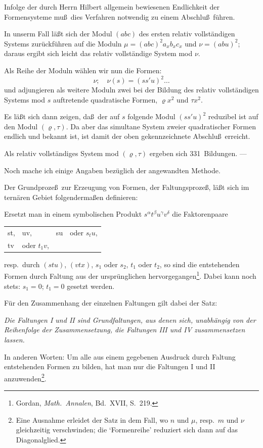 \documentclass[11pt,a4paper]{article}
\theoremstyle{plain}
\theoremstyle{definition}
\begin{document}
Infolge der durch Herrn Hilbert allgemein bewiesenen Endlichkeit der Formensysteme mu\ss\ dies Verfahren notwendig zu einem Abschlu\ss\ f\"uhren.

In unserm Fall l\"a\ss t sich der Modul $(abc)$ des ersten relativ vollst\"andigen Systems zur\"uckf\"uhren auf die Moduln $\mu = (abc)^2 a_x b_x c_x$ und $\nu = (abu)^2$; daraus ergibt sich leicht das relativ vollst\"andige System mod $\nu$.

Als Reihe der Moduln w\"ahlen wir nun die Formen:
\[
\nu; \quad \nu(s) = (ss'u)^2 \dots
\]
und adjungieren als weitere Moduln zwei bei der Bildung des relativ vollst\"andigen Systems mod $s$ auftretende quadratische Formen, $\varrho x^2$ und $\tau x^2$.

Es l\"a\ss t sich dann zeigen, da\ss\ der auf $s$ folgende Modul $(ss'u)^2$ reduzibel ist auf den Modul $(\varrho, \tau)$. Da aber das simultane System zweier quadratischer Formen endlich und bekannt ist, ist damit der oben gekennzeichnete Abschlu\ss\ erreicht.

Als relativ vollst\"andiges System mod $(\varrho, \tau)$ ergeben sich 331~Bildungen. ---

Noch mache ich einige Angaben bez\"uglich der angewandten Methode.

Der Grundproze\ss\ zur Erzeugung von Formen, der Faltungsproze\ss, l\"a\ss t sich im tern\"aren Gebiet folgenderma\ss en definieren:

Ersetzt man in einem symbolischen Produkt $s^\alpha t^\beta u^\gamma v^\delta$ die Faktorenpaare
\begin{center}
\begin{tabular}{llll}
st, & uv, & su & oder \quad $s_tu$, \\
tv & oder \quad $t_1v$, &
\end{tabular}
\end{center}
resp.~durch $(stu)$, $(vtx)$, $s_1$ oder $s_2$, $t_1$ oder $t_2$,
so sind die entstehenden Formen durch Faltung aus der urspr\"unglichen hervorgegangen\footnote{Gordan, \textit{Math.~Annalen}, Bd.~XVII, S.~219.}. Dabei kann noch stets: $s_1 = 0$; $t_1 = 0$ gesetzt werden.

F\"ur den Zusammenhang der einzelnen Faltungen gilt dabei der Satz:

\textit{Die Faltungen I und II sind Grundfaltungen, aus denen sich, unabh\"angig von der Reihenfolge der Zusammensetzung, die Faltungen III und IV zusammensetzen lassen.}

In anderen Worten: Um alle aus einem gegebenen Ausdruck durch Faltung entstehenden Formen zu bilden, hat man nur die Faltungen I und II anzuwenden\footnote{Eine Ausnahme erleidet der Satz in dem Fall, wo $n$ und $\mu$, resp.~$m$ und $\nu$ gleichzeitig verschwinden; die `Formenreihe' reduziert sich dann auf das Diagonalglied.}.
\end{document}
